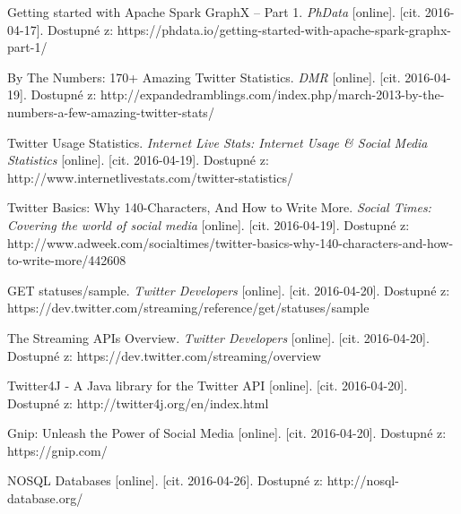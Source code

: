 \documentclass[thesis=B,czech]{FITthesis}[2012/06/26]
\begin{document}
\begin{thebibliography}{1}
Getting started with Apache Spark GraphX – Part 1. \textit{PhData} [online]. [cit. 2016-04-17]. Dostupné z: https://phdata.io/getting-started-with-apache-spark-graphx-part-1/

By The Numbers: 170+ Amazing Twitter Statistics. \textit{DMR} [online]. [cit. 2016-04-19]. Dostupné z: http://expandedramblings.com/index.php/march-2013-by-the-numbers-a-few-amazing-twitter-stats/

Twitter Usage Statistics. \textit{Internet Live Stats: Internet Usage \& Social Media Statistics} [online]. [cit. 2016-04-19]. Dostupné z: http://www.internetlivestats.com/twitter-statistics/

Twitter Basics: Why 140-Characters, And How to Write More. \textit{Social Times: Covering the world of social media} [online]. [cit. 2016-04-19]. Dostupné z: http://www.adweek.com/socialtimes/twitter-basics-why-140-characters-and-how-to-write-more/442608

GET statuses/sample. \textit{Twitter Developers} [online]. [cit. 2016-04-20]. Dostupné z: https://dev.twitter.com/streaming/reference/get/statuses/sample

The Streaming APIs Overview. \textit{Twitter Developers} [online]. [cit. 2016-04-20]. Dostupné z: https://dev.twitter.com/streaming/overview

Twitter4J - A Java library for the Twitter API [online]. [cit. 2016-04-20]. Dostupné z: http://twitter4j.org/en/index.html

Gnip: Unleash the Power of Social Media [online]. [cit. 2016-04-20]. Dostupné z: https://gnip.com/

NOSQL Databases [online]. [cit. 2016-04-26]. Dostupné z: http://nosql-database.org/

  
\end{thebibliography}



\appendix
\end{document}
